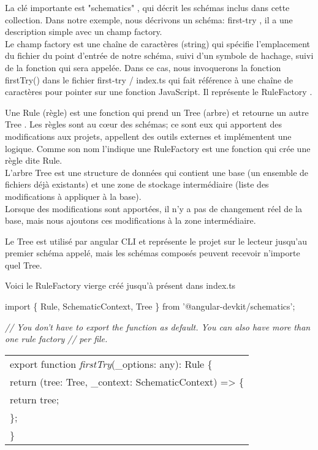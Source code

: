 \documentclass[12pt,french]{article}
\begin{document}
	La clé importante est "schematics" , qui décrit les schémas inclus dans cette collection. 
	Dans notre exemple, nous décrivons un schéma: first-try , il a une description simple avec un champ factory.\\
	Le champ factory est une chaîne de caractères (string) qui spécifie l'emplacement du fichier du point d'entrée de notre schéma, suivi d'un symbole de hachage, suivi de la fonction qui sera appelée. Dans  ce cas, nous invoquerons la fonction firstTry() dans le fichier first-try / index.ts  qui fait référence à une chaîne de caractères pour pointer sur une fonction JavaScript. Il représente le RuleFactory .\newline 
	
	Une Rule (règle) est une fonction qui prend un Tree (arbre) et retourne un autre Tree . Les règles sont au cœur des schémas; ce sont eux qui apportent des modifications aux projets, appellent des outils externes et implémentent une logique. Comme son nom l'indique une RuleFactory est une fonction qui crée une règle dite Rule.\\
	L'arbre Tree est une structure de données qui contient une base (un ensemble de fichiers déjà existants) et une zone de stockage intermédiaire (liste des modifications à appliquer à la base).\\
	Lorsque des modifications sont apportées, il n'y a pas de changement réel de la base, mais nous ajoutons ces modifications à la zone intermédiaire.\newline
	
	Le Tree est utilisé par angular CLI et représente le projet sur le lecteur jusqu'au premier schéma appelé, mais les schémas composés peuvent recevoir n’importe quel Tree.\newline
	
	Voici le RuleFactory vierge créé jusqu'à présent dans index.ts\newline
	
	import \{ Rule, SchematicContext, Tree \} from '@angular-devkit/schematics';\newline
	
	\textit{// You don't have to export the function as default. You can also have more than one rule factory}\newline
	\textit{// per file.}\newline
	
	\begin{tabular}{l}
		export function \textit{firstTry}(\_options: any): Rule \{\\
		\quad return (tree: Tree, \_context: SchematicContext) => \{\\
		\qquad return tree;\\
		\quad\};\\
		\}\\
	\end{tabular}\break
\end{document}
